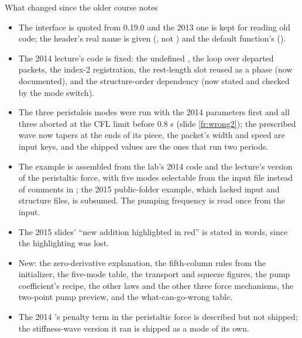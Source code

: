 \documentclass[aspectratio=169,11pt]{beamer}
\begin{document}
\begin{frame}{What changed since the older course notes}
\label{fr:changed}
\footnotesize
\begin{itemize}
  \item The interface is quoted from 0.19.0 and the 2013 one is kept for reading old code; the header's real name is given (, not ) and the default function's ().
  \item The 2014 lecture's code is fixed: the undefined , the loop over departed packets, the index-2 registration, the rest-length slot reused as a phase (now documented), and the structure-order dependency (now stated and checked by the mode switch).
  \item The three peristalsis modes were run with the 2014 parameters first and all three aborted at the CFL limit before $0.8$ s (slide \ref{fr:wrong2}); the prescribed wave now tapers at the ends of its piece, the packet's width and speed are input keys, and the shipped values are the ones that run two periods.
  \item The example is assembled from the lab's 2014  code and the lecture's version of the peristaltic force, with five modes selectable from the input file instead of comments in ; the 2015 public-folder example, which lacked input and structure files, is subsumed. The pumping frequency is read once from the input.
  \item The 2015 slides' ``new addition highlighted in red'' is stated in words, since the highlighting was lost.
  \item New: the zero-derivative explanation, the fifth-column rules from the initializer, the five-mode table, the transport and squeeze figures, the pump coefficient's recipe, the other laws and the other three force mechanisms, the two-point pump preview, and the what-can-go-wrong table.
  \item The 2014 's penalty term in the peristaltic force is described but not shipped; the stiffness-wave version it ran is shipped as a mode of its own.
\end{itemize}
\end{frame}
\end{document}
